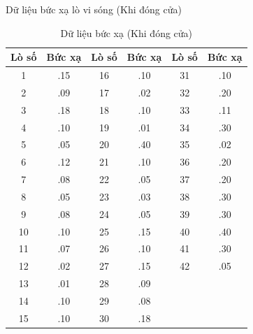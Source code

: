 \begin{frame}{Dữ liệu bức xạ lò vi sóng (Khi đóng cửa)}
    \begin{table}[h]
        \centering
        \caption{Dữ liệu bức xạ (Khi đóng cửa)}
        \vspace{-0.2cm}
        \footnotesize %
        \renewcommand{\arraystretch}{0.85} %
        \begin{tabular}{cc@{\hskip 0.8cm}cc@{\hskip 0.8cm}cc}
        \toprule
        \textbf{Lò số} & \textbf{Bức xạ} & \textbf{Lò số} & \textbf{Bức xạ} & \textbf{Lò số} & \textbf{Bức xạ} \\
        \midrule
        1  & .15 & 16 & .10 & 31 & .10 \\
        2  & .09 & 17 & .02 & 32 & .20 \\
        3  & .18 & 18 & .10 & 33 & .11 \\
        4  & .10 & 19 & .01 & 34 & .30 \\
        5  & .05 & 20 & .40 & 35 & .02 \\
        6  & .12 & 21 & .10 & 36 & .20 \\
        7  & .08 & 22 & .05 & 37 & .20 \\
        8  & .05 & 23 & .03 & 38 & .30 \\
        9  & .08 & 24 & .05 & 39 & .30 \\
        10 & .10 & 25 & .15 & 40 & .40 \\
        11 & .07 & 26 & .10 & 41 & .30 \\
        12 & .02 & 27 & .15 & 42 & .05 \\
        13 & .01 & 28 & .09 &    &     \\
        14 & .10 & 29 & .08 &    &     \\
        15 & .10 & 30 & .18 &    &     \\
        \bottomrule
        \end{tabular}
    \end{table}
    \vspace{-0.3cm}
\end{frame}

